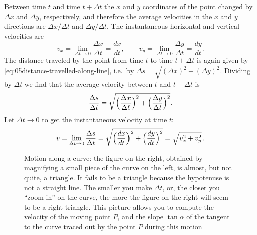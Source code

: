 Between time $t$ and time $t+\Delta t$ the $x$ and $y$ coordinates of the point
changed by $\Delta x$ and $\Delta y$, respectively, and therefore the average
velocities in the $x$ and $y$ directions are $\Delta x/\Delta t$ and $\Delta
y/\Delta t$.  The instantaneous horizontal and vertical velocities are
\[
v_x = \lim_{\Delta t\to 0} \frac{\Delta x} {\Delta t} = \frac{dx}{dt},
\qquad
v_y = \lim_{\Delta t\to 0} \frac{\Delta y} {\Delta t} = \frac{dy}{dt}.
\]
The distance traveled by the point from time $t$ to time $t+\Delta t$ is again
given by \eqref{eq:05distance-travelled-along-line}, i.e.~by $\Delta s =
\sqrt{(\Delta x)^2 + (\Delta y)^2}$.  Dividing by $\Delta t$ we find that the
average velocity between $t$ and $t+ \Delta t$ is
\[
\frac{\Delta s} {\Delta t}
=
\sqrt{\Bigl(\frac{\Delta x} {\Delta t}\Bigr)^2 +
  \Bigl(\frac{\Delta y} {\Delta t}\Bigr)^2}.
\]
Let $\Delta t\to 0$ to get the instantaneous velocity at time $t$:
\begin{equation}
  v = \lim_{\Delta t\to 0} \frac{\Delta s} {\Delta t}
  =\sqrt{ \Bigl(\frac{dx} {dt} \Bigr)^2
    + \Bigl(\frac{d y} {dt}\Bigr)^2}
  =\sqrt{v_x^2 + v_y^2} \,.
  \label{eq:05instantaneous-velocity}
\end{equation}
\begin{figure}[t]\sffamily
  
  \caption{Motion along a curve: the figure on the right, obtained by
    magnifying a small piece of the curve on the left, is almost, but
    not quite, a triangle.  It fails to be a triangle because the
    hypotenuse is not a straight line.  The smaller you make $\Delta
    t$, or, the closer you ``zoom in'' on the curve, the more the
    figure on the right will seem to be a right triangle.  This picture
    allows you to compute the velocity of the moving point $P$, and
    the slope $\tan \alpha$ of the tangent to the curve traced out by
    the point $P$ during this motion}
  \label{fig:05motion-along-a-curve}
\end{figure}
